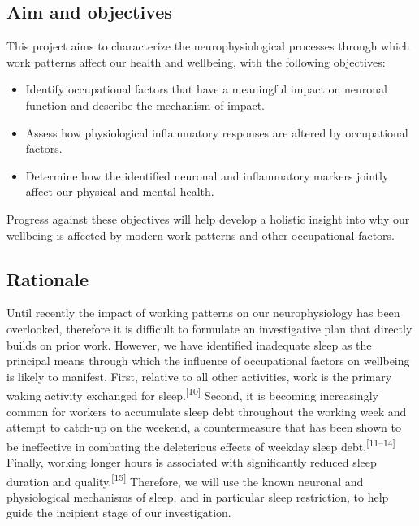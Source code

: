 \documentclass[
  english,
  man]{apa6}
\providecommand{\tightlist}{%
  \setlength{\itemsep}{0pt}\setlength{\parskip}{0pt}}
\begin{document}
\newpage

\hypertarget{aim-and-objectives}{%
\subsection{Aim and objectives}\label{aim-and-objectives}}

This project aims to characterize the neurophysiological processes through which work patterns affect our health and wellbeing, with the following objectives:

\begin{itemize}
\tightlist
\item
  Identify occupational factors that have a meaningful impact on neuronal function and describe the mechanism of impact.
\item
  Assess how physiological inflammatory responses are altered by occupational factors.
\item
  Determine how the identified neuronal and inflammatory markers jointly affect our physical and mental health.
\end{itemize}

Progress against these objectives will help develop a holistic insight into why our wellbeing is affected by modern work patterns and other occupational factors.

\newpage

\hypertarget{rationale}{%
\subsection{Rationale}\label{rationale}}

Until recently the impact of working patterns on our neurophysiology has been overlooked, therefore it is difficult to formulate an investigative plan that directly builds on prior work. However, we have identified inadequate sleep as the principal means through which the influence of occupational factors on wellbeing is likely to manifest. First, relative to all other activities, work is the primary waking activity exchanged for sleep.\textsuperscript{{[}10{]}} Second, it is becoming increasingly common for workers to accumulate sleep debt throughout the working week and attempt to catch-up on the weekend, a countermeasure that has been shown to be ineffective in combating the deleterious effects of weekday sleep debt.\textsuperscript{{[}11--14{]}} Finally, working longer hours is associated with significantly reduced sleep duration and quality.\textsuperscript{{[}15{]}} Therefore, we will use the known neuronal and physiological mechanisms of sleep, and in particular sleep restriction, to help guide the incipient stage of our investigation.
\end{document}
